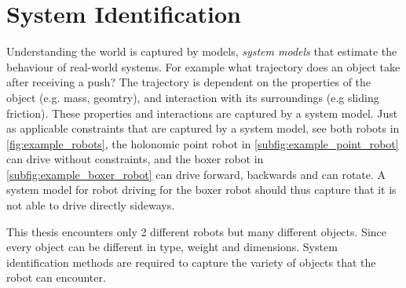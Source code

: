 \section{System Identification}%
\label{sec:sys_iden}
Understanding the world is captured by models, \textit{system models} that estimate the behaviour of real-world systems. For example what trajectory does an object take after receiving a push? The trajectory is dependent on the properties of the object (e.g. mass, geomtry), and interaction with its surroundings (e.g sliding friction). These properties and interactions are captured by a system model. Just as applicable constraints that are captured by a system model, see both robots in \cref{fig:example_robots}, the holonomic point robot in \cref{subfig:example_point_robot} can drive without constraints, and the boxer robot in \cref{subfig:example_boxer_robot} can drive forward, backwards and can rotate. A system model for robot driving for the boxer robot should thus capture that it is not able to drive directly sideways.\bs

This thesis encounters only 2 different robots but many different objects. Since every object can be different in type, weight and dimensions. System identification methods are required to capture the variety of objects that the robot can encounter.\bs


